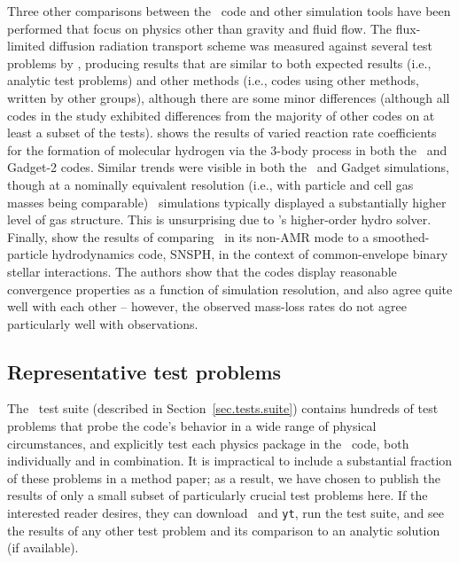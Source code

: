 Three other comparisons between the \enzo\ code and other simulation
tools have been performed that focus on physics other than gravity and
fluid flow.  The flux-limited diffusion radiation transport scheme was
measured against several test problems by \citet{IlievEtAl2009},
producing results that are similar to both expected results (i.e.,
analytic test problems) and other methods (i.e., codes using other
methods, written by other groups), although there are some minor
differences (although all codes in the study exhibited differences
from the majority of other codes on at least a subset of the tests).
\citet{2011ApJ...726...55T} shows the results of varied reaction rate
coefficients for the formation of molecular hydrogen via the 3-body
process in both the \enzo\ and Gadget-2 codes.  Similar trends were
visible in both the \enzo\ and Gadget simulations, though at a
nominally equivalent resolution (i.e., with particle and cell gas
masses being comparable) \enzo\ simulations typically displayed a
substantially higher level of gas structure.  This is unsurprising due
to \enzo's higher-order hydro solver.  Finally,
\citet{2012ApJ...744...52P} show the results of comparing \enzo\ in
its non-AMR mode to a smoothed-particle hydrodynamics code, SNSPH, in
the context of common-envelope binary stellar interactions.  The
authors show that the codes display reasonable convergence properties
as a function of simulation resolution, and also agree quite well with
each other -- however, the observed mass-loss rates do not agree
particularly well with observations.

\subsection{Representative test problems}
\label{sec.tests.problems}

The \enzo\ test suite (described in Section~\ref{sec.tests.suite})
contains hundreds of test problems that probe the code's behavior in a
wide range of physical circumstances, and explicitly test each physics
package in the \enzo\ code, both individually and in combination.  It
is impractical to include a substantial fraction of these problems in
a method paper; as a result, we have chosen to publish the results of
only a small subset of particularly crucial test problems here.  If
the interested reader desires, they can download \enzo\ and
\texttt{yt}, run the test suite, and see the results of any other test
problem and its comparison to an analytic solution (if available).

